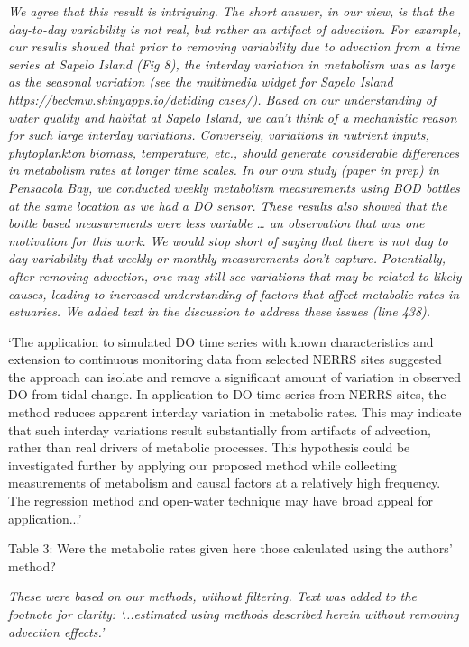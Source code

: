 \documentclass[letterpaper,12pt]{article}\usepackage[]{graphicx}\usepackage[]{color}
\begin{document}
{\it We agree that this result is intriguing.  The short answer, in our view, is that the day-to-day variability is not real, but rather an artifact of advection.  For example, our results showed that prior to removing variability due to advection from a time series at Sapelo Island (Fig 8), the interday variation in metabolism was as large as the seasonal variation (see the multimedia widget for Sapelo Island https://beckmw.shinyapps.io/detiding cases/).  Based on our understanding of water quality and habitat at Sapelo Island, we can’t think of a mechanistic reason for such large interday variations.  Conversely, variations in nutrient inputs, phytoplankton biomass, temperature, etc., should generate considerable differences in metabolism rates at longer time scales.  In our own study (paper in prep) in Pensacola Bay, we conducted weekly metabolism measurements using BOD bottles at the same location as we had a DO sensor.  These results also showed that the bottle based measurements were less variable … an observation that was one motivation for this work.  We would stop short of saying that there is not day to day variability that weekly or monthly measurements don’t capture.  Potentially, after removing advection, one may still see variations that may be related to likely causes, leading to increased understanding of factors that affect metabolic rates in estuaries.  We added text in the discussion to address these issues (line 438).

`The application to simulated DO time series with known characteristics and extension to continuous monitoring data from selected NERRS sites suggested the approach can isolate and remove a significant amount of variation in observed DO from tidal change.  In application to DO time series from NERRS sites, the method reduces apparent interday variation in metabolic rates.  This may indicate that such interday variations result substantially from artifacts of advection, rather than real drivers of metabolic processes. This hypothesis could be investigated further by applying our proposed method while collecting measurements of metabolism and causal factors at a relatively high frequency.  The regression method and open-water technique may have broad appeal for application...'
}

Table 3: Were the metabolic rates given here those calculated using the authors’ method?

{\it These were based on our methods, without filtering.  Text was added to the footnote for clarity: `...estimated using methods described herein without removing advection effects.'}
\end{document}
